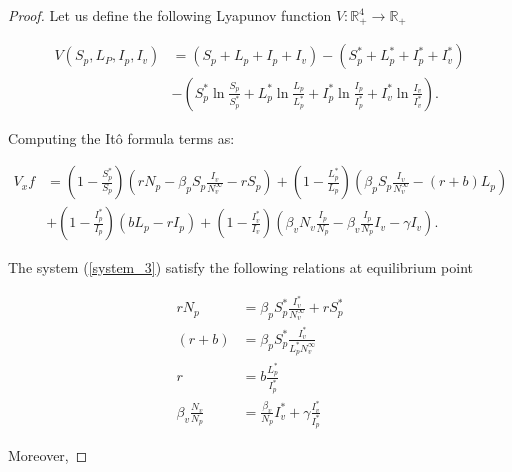 \begin{proof}
	Let us define the following Lyapunov function $V:\mathbb{R}^4_+\rightarrow \mathbb{R}_+$
	
	\begin{align*}
		V(S_p,L_P,I_p,I_v) 
				&= 
					(S_p+L_p+I_p+I_v)-(S^*_p+L^*_p+I^*_p+I^*_v)\\
				&-
					\left(S^*_p\ln\frac{S_p}{S^*_p}+L^*_p\ln\frac{L_p}{L^*_p}+I^*_p\ln\frac{I_p}{I^*_p}+I^*_v\ln\frac{I_v}{I^*_v}\right).
	\end{align*}
	
	Computing the It\^{o} formula terms as:
	
	\begin{align*}
		V_xf &=
			\left(1-\frac{S^*_p}{S_p}\right)\left(rN_p-\beta_pS_p\frac{I_v}{N^\infty_v}-rS_p\right)+\left(1-\frac{L^*_p}{L_p}\right)\left(\beta_pS_p\frac{I_v}{N^\infty_v}-(r+b)L_p\right)\\
			&+ \left(1-\frac{I^*_p}{I_p}\right)\left(bL_p-rI_p\right)+ \left(1-\frac{I^*_v}{I_v}\right)\left(\beta_v N_v\frac{I_p}{N_p}-\beta_v \frac{I_p}{N_p}I_v-\gamma I_v\right).
	\end{align*}
	
	The system (\ref{system_3}) satisfy the following relations at equilibrium point
	
	\begin{align*}
		rN_p&=
			\beta_pS^*_p\frac{I^*_v}{N^\infty_v}+rS^*_p\\
		(r+b)&=
			\beta_pS^*_p\frac{I^*_v}{L^*_p N^\infty_v}\\
		r &=
			b\frac{L^*_p}{I^*_p}\\
		\beta_v\frac{N_v}{N_p}&=
			\frac{\beta_v}{N_p}I^*_v+\gamma \frac{I^*_v}{I^*_p}		
	\end{align*}
	
	Moreover,
	

\end{proof}
